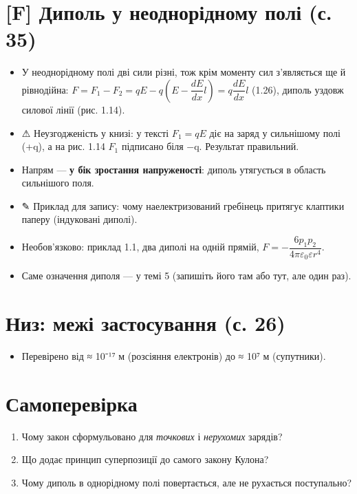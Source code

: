 \documentclass[11pt,a4paper,oneside]{book}
\newcommand{\pen}{{\sffamily\color{accent}✎}}
\newcommand{\warn}{{\sffamily\color{warncol}⚠}}
\begin{document}
\section*{[F] Диполь у неоднорідному полі (с. 35)}
\begin{itemize}
\item У неоднорідному полі дві сили різні, тож крім моменту сил з'являється ще й рівнодійна:
$F = F_1 - F_2 = qE - q\left(E - \dfrac{dE}{dx}l\right) = q\dfrac{dE}{dx}l$ (1.26), диполь уздовж силової лінії (рис. 1.14).
\item \warn{} Неузгодженість у книзі: у тексті $F_1 = qE$ діє на заряд у сильнішому полі (+q), а на рис. 1.14 $F_1$ підписано біля −q. Результат правильний.
\item Напрям — \textbf{у бік зростання напруженості}: диполь утягується в область сильнішого поля.
\item \pen{} Приклад для запису: чому наелектризований гребінець притягує клаптики паперу (індуковані диполі).
\item Необов'язково: приклад 1.1, два диполі на одній прямій, $F = -\dfrac{6p_1p_2}{4\pi\varepsilon_0\varepsilon r^4}$.
\item Саме означення диполя — у темі 5 (запишіть його там або тут, але один раз).
\end{itemize}

\section*{Низ: межі застосування (с. 26)}
\begin{itemize}
\item Перевірено від ≈ 10⁻¹⁷ м (розсіяння електронів) до ≈ 10⁷ м (супутники).
\end{itemize}

\section*{Самоперевірка}
\begin{enumerate}
\item Чому закон сформульовано для \textit{точкових} і \textit{нерухомих} зарядів?
\item Що додає принцип суперпозиції до самого закону Кулона?
\item Чому диполь в однорідному полі повертається, але не рухається поступально?
\end{enumerate}
\end{document}
